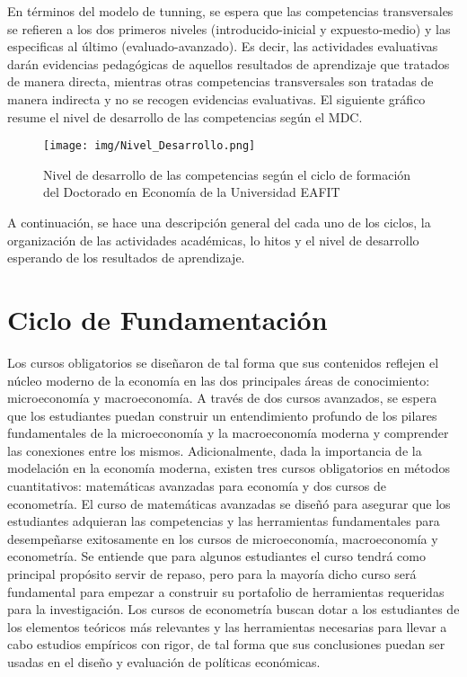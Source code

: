 En términos del modelo de tunning, se espera que las competencias transversales se refieren a los dos primeros niveles (introducido-inicial y expuesto-medio) y las especificas al último (evaluado-avanzado). Es decir, las actividades evaluativas darán evidencias pedagógicas de aquellos resultados de aprendizaje que tratados de manera directa, mientras otras competencias transversales son tratadas de manera indirecta y no se recogen evidencias evaluativas. El siguiente gráfico resume el nivel de desarrollo de las competencias según el MDC. 


\begin{figure}[H]
\caption{Nivel de desarrollo de las competencias según el ciclo de formación del Doctorado en Economía de la Universidad EAFIT \label{Estructura} }
\begin{center}
\texttt{[image: img/Nivel\_Desarrollo.png]}
\end{center}
\end{figure}

A continuación, se hace una descripción general del cada uno de los ciclos, la organización de las actividades académicas, lo hitos y el nivel de desarrollo esperando de los resultados de aprendizaje. 

\section{Ciclo de Fundamentación}

Los cursos obligatorios se diseñaron de tal forma que sus contenidos reflejen el núcleo moderno de la economía en las dos principales áreas de conocimiento: microeconomía y macroeconomía. A través de dos cursos avanzados, se espera que los estudiantes puedan construir un entendimiento profundo de los pilares fundamentales de la microeconomía y la macroeconomía moderna y comprender las conexiones entre los mismos. Adicionalmente, dada la importancia de la modelación en la economía moderna, existen tres cursos obligatorios en métodos cuantitativos: matemáticas avanzadas para economía y dos cursos de econometría. El curso de matemáticas avanzadas se diseñó para asegurar que los estudiantes adquieran las competencias y las herramientas fundamentales para desempeñarse exitosamente en los cursos de microeconomía, macroeconomía y econometría. Se entiende que para algunos estudiantes el curso tendrá como principal propósito servir de repaso, pero para la mayoría dicho curso será fundamental para empezar a construir su portafolio de herramientas requeridas para la investigación. Los cursos de econometría buscan dotar a los estudiantes de los elementos teóricos más relevantes y las herramientas necesarias para llevar a cabo estudios empíricos con rigor, de tal forma que sus conclusiones puedan ser usadas en el diseño y evaluación de políticas económicas. 

